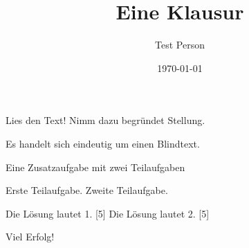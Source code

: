 \documentclass[a4paper]{scrartcl}
\author{Test Person}
\date{\today}
\title{Eine Klausur}
\begin{document}
\begin{aufgabe}
    \blindtext
    \begin{teilaufgaben}
        \teilaufgabe[5] Lies den Text!
        \teilaufgabe[10] Nimm dazu begründet Stellung.
    \end{teilaufgaben}
    \begin{loesung}
        Es handelt sich eindeutig um einen Blindtext.
    \end{loesung}
\end{aufgabe}

\begin{aufgabe*}
    Eine Zusatzaufgabe mit zwei Teilaufgaben
    \begin{teilaufgaben}
        \teilaufgabe Erste Teilaufgabe.
        \teilaufgabe Zweite Teilaufgabe.
    \end{teilaufgaben}
    \begin{loesung*}
        \begin{teilaufgaben}
            \teilaufgabe Die Lösung lautet 1.
                [5]
            \teilaufgabe Die Lösung lautet 2.
                [5]
        \end{teilaufgaben}
    \end{loesung*}
\end{aufgabe*}

\vspace{1cm}
{\Huge Viel Erfolg!}

\vfill
\punktuebersicht
\end{document}
